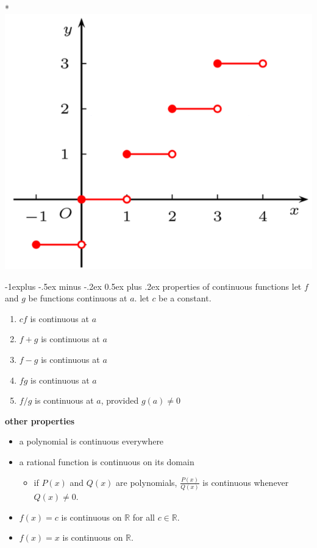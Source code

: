 \documentclass[10pt, landscape]{article}
\makeatletter
\renewcommand{\subsection}{\@startsection{subsection}{2}{0mm}%
                                {-1explus -.5ex minus -.2ex}%
                                {0.5ex plus .2ex}%
                                {\normalfont\normalsize\bfseries}}
\makeatother
\begin{document}
\begin{multicols}{4}
\begin{center}
\begin{multicols*}{3}
        \\* \includegraphics[width=0.95\linewidth]{ma1102r-jump-discontinuity.png}
    \end{multicols*}
\end{center}

\subsection{properties of continuous functions}
let $f$ and $g$ be functions continuous at $a$. let $c$ be a constant.
\begin{enumerate}
    \item $cf$ is continuous at $a$
    \item $f+g$ is continuous at $a$
    \item $f-g$ is continuous at $a$
    \item $fg$ is continuous at $a$
    \item $f/g$ is continuous at $a$, provided $g(a) \neq 0$
\end{enumerate}

\textbf{other properties}
\begin{itemize}
    \item a polynomial is continuous everywhere
    \item a rational function is continuous on its domain
    \begin{itemize}
        \item if $P(x)$ and $Q(x)$ are polynomials, $\frac{P(x)}{Q(x)}$ is continuous whenever $Q(x) \neq 0$.
    \end{itemize}
    \item $f(x) = c$ is continuous on $\mathbb{R}$ for all $c \in \mathbb{R}$.
    \item $f(x) = x$ is continuous on $\mathbb{R}$.
\end{itemize}


\end{multicols}
\end{document}
